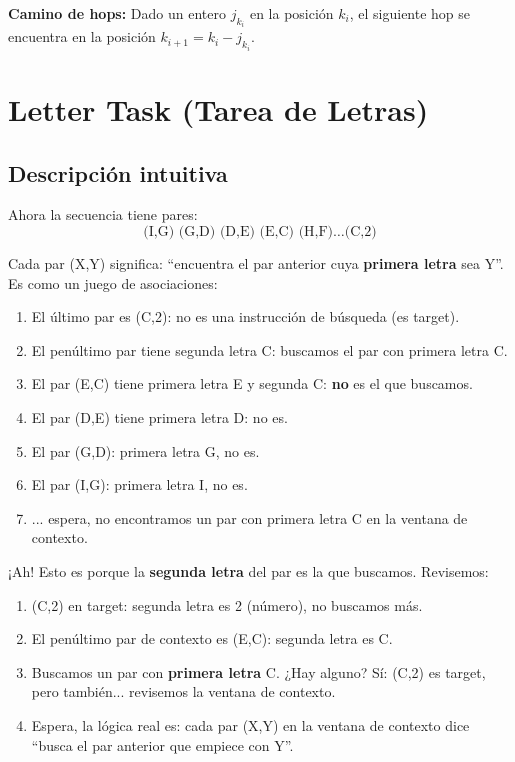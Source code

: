 \documentclass[12pt,a4paper,oneside]{report}
\begin{document}
\textbf{Camino de hops:} Dado un entero $j_{k_i}$ en la posición $k_i$, el siguiente hop se encuentra en la posición $k_{i+1} = k_i - j_{k_i}$.

\section{Letter Task (Tarea de Letras)}

\subsection{Descripción intuitiva}

Ahora la secuencia tiene pares:
\[
\text{(I,G) (G,D) (D,E) (E,C) (H,F)} \dots \text{(C,2)}
\]

Cada par (X,Y) significa: ``encuentra el par anterior cuya \textbf{primera letra} sea Y''. Es como un juego de asociaciones:

\begin{enumerate}
    \item El último par es (C,2): no es una instrucción de búsqueda (es target).
    \item El penúltimo par tiene segunda letra C: buscamos el par con primera letra C.
    \item El par (E,C) tiene primera letra E y segunda C: \textbf{no} es el que buscamos.
    \item El par (D,E) tiene primera letra D: no es.
    \item El par (G,D): primera letra G, no es.
    \item El par (I,G): primera letra I, no es.
    \item ... espera, no encontramos un par con primera letra C en la ventana de contexto.
\end{enumerate}

¡Ah! Esto es porque la \textbf{segunda letra} del par es la que buscamos. Revisemos:

\begin{enumerate}
    \item (C,2) en target: segunda letra es 2 (número), no buscamos más.
    \item El penúltimo par de contexto es (E,C): segunda letra es C.
    \item Buscamos un par con \textbf{primera letra} C. ¿Hay alguno? Sí: (C,2) es target, pero también... revisemos la ventana de contexto.
    \item Espera, la lógica real es: cada par (X,Y) en la ventana de contexto dice ``busca el par anterior que empiece con Y''.
\end{enumerate}
\end{document}

